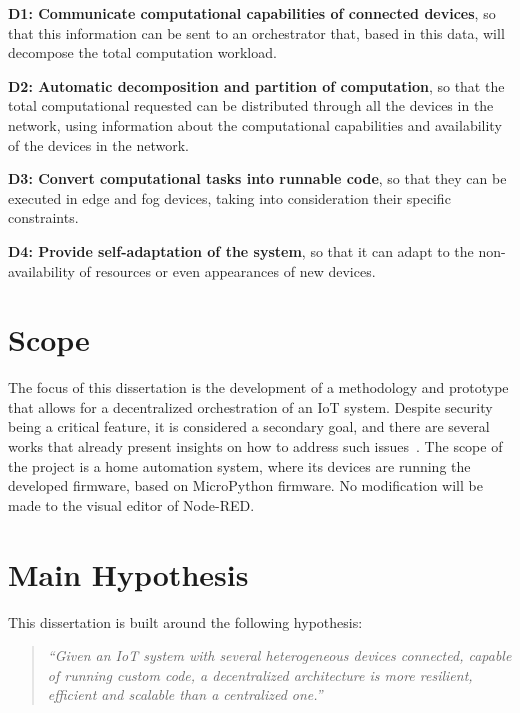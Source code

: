 \begin{description}
    \item \textbf{D1: Communicate computational capabilities of connected devices}, so that this information can be sent to an orchestrator that, based in this data, will decompose the total computation workload.
    \item \textbf{D2: Automatic decomposition and partition of computation}, so that the total computational requested can be distributed through all the devices in the network, using information about the computational capabilities and availability of the devices in the network.
    \item \textbf{D3: Convert computational tasks into runnable code}, so that they can be executed in edge and fog devices, taking into consideration their specific constraints.
    \item \textbf{D4: Provide self-adaptation of the system}, so that it can adapt to the non-availability of resources or even appearances of new devices.
\end{description}

\section{Scope}\label{sec:scope}

The focus of this dissertation is the development of a methodology and prototype that allows for a decentralized orchestration of an IoT system. Despite security being a critical feature, it is considered a secondary goal, and there are several works that already present insights on how to address such issues~\cite{pinto2018blockchainbased,li2019online,xu2014security,Dias2017,jias18}. The scope of the project is a home automation system, where its devices are running the developed firmware, based on MicroPython firmware. No modification will be made to the visual editor of Node-RED.

\section{Main Hypothesis}\label{sec:main_hypothesis}

This dissertation is built around the following hypothesis:

\begin{quote}
    \emph{``Given an IoT system with several heterogeneous devices connected, capable of running custom code, a decentralized architecture is more resilient, efficient and scalable than a centralized one.''}
\end{quote}

